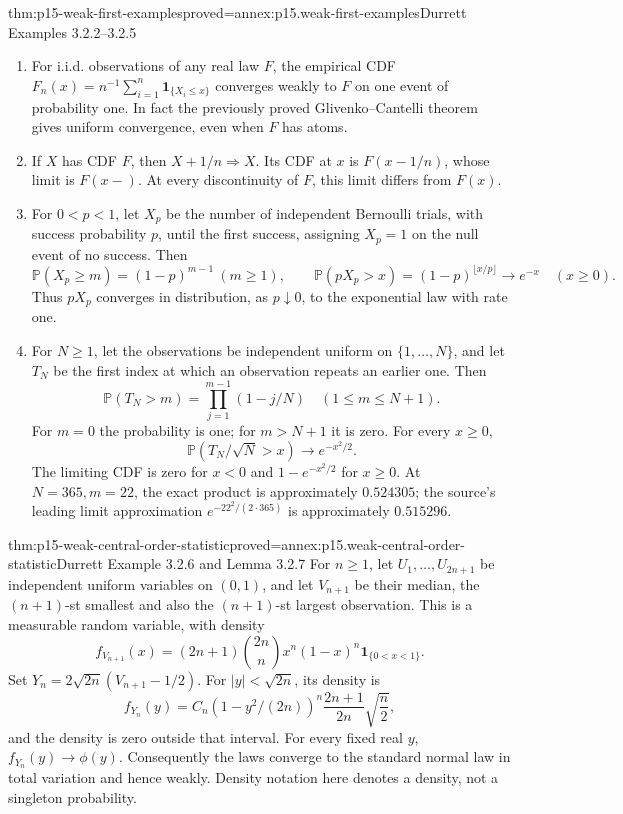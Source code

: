 \begin{hbtheorem}{thm:p15-weak-first-examples}{proved=annex:p15.weak-first-examples}{Durrett Examples 3.2.2--3.2.5}
\begin{enumerate}
\item For i.i.d. observations of any real law \(F\), the empirical
CDF \(F_n(x)=n^{-1}\sum_{i=1}^n\mathbf1_{\{X_i\leq x\}}\)
converges weakly to \(F\) on one event of probability one.
In fact the previously proved Glivenko--Cantelli theorem gives
uniform convergence, even when \(F\) has atoms.
\item If \(X\) has CDF \(F\), then \(X+1/n\Rightarrow X\).
Its CDF at \(x\) is \(F(x-1/n)\), whose limit is \(F(x-)\).
At every discontinuity of \(F\), this limit differs from \(F(x)\).
\item For \(0<p<1\), let \(X_p\) be the number of independent
Bernoulli trials, with success probability \(p\), until the first
success, assigning \(X_p=1\) on the null event of no success.
Then
\[
 \mathbb P(X_p\geq m)=(1-p)^{m-1}\ (m\geq1),\qquad
 \mathbb P(pX_p>x)=(1-p)^{\lfloor x/p\rfloor}\longrightarrow e^{-x}
 \quad(x\geq0).
\]
Thus \(pX_p\) converges in distribution, as \(p\downarrow0\),
to the exponential law with rate one.
\item For \(N\geq1\), let the observations be independent uniform
on \(\{1,\ldots,N\}\), and let \(T_N\) be the first index at
which an observation repeats an earlier one. Then
\[
 \mathbb P(T_N>m)=\prod_{j=1}^{m-1}(1-j/N)
                         \quad(1\leq m\leq N+1).
\]
For \(m=0\) the probability is one; for \(m>N+1\) it is zero.
For every \(x\geq0\),
\[
 \mathbb P(T_N/\sqrt N>x)\longrightarrow e^{-x^2/2}.
\]
The limiting CDF is zero for \(x<0\) and \(1-e^{-x^2/2}\)
for \(x\geq0\). At \(N=365,m=22\), the exact product is
approximately \(0.524305\); the source's leading limit
approximation \(e^{-22^2/(2\cdot365)}\) is approximately \(0.515296\).
\end{enumerate}
\end{hbtheorem}

\begin{hbtheorem}{thm:p15-weak-central-order-statistic}{proved=annex:p15.weak-central-order-statistic}{Durrett Example 3.2.6 and Lemma 3.2.7}
For \(n\geq1\), let \(U_1,\ldots,U_{2n+1}\) be independent
uniform variables on \((0,1)\), and let \(V_{n+1}\) be their
median, the \((n+1)\)-st smallest and also the \((n+1)\)-st
largest observation. This is a measurable random variable,
with density
\[
 f_{V_{n+1}}(x)
  =(2n+1)\binom{2n}{n}x^n(1-x)^n\mathbf1_{\{0<x<1\}}.
\]
Set \(Y_n=2\sqrt{2n}(V_{n+1}-1/2)\).
For \(|y|<\sqrt{2n}\), its density is
\[
 f_{Y_n}(y)
 =C_n(1-y^2/(2n))^n\frac{2n+1}{2n}\sqrt{\frac n2},
\]
and the density is zero outside that interval.
For every fixed real \(y\), \(f_{Y_n}(y)\to\phi(y)\).
Consequently the laws converge to the standard normal law
in total variation and hence weakly.
Density notation here denotes a density, not a singleton probability.
\end{hbtheorem}

